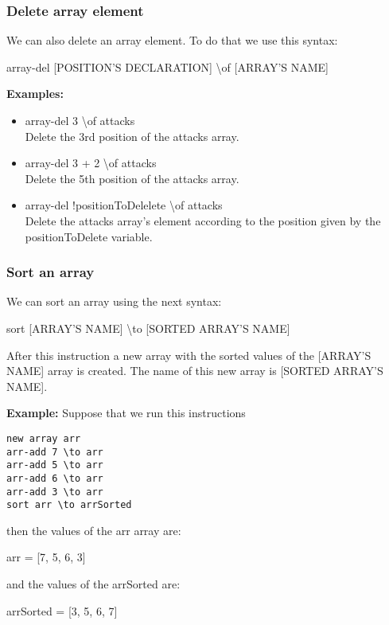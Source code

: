 \documentclass[11pt,a4paper,openright,oneside]{book}
\newenvironment{exs}
{
  \setlength{\parindent}{0cm}
  \large \textbf{Examples:} \normalsize
}
{}
\newenvironment{ex}
{
  \setlength{\parindent}{0cm}
  \large \textbf{Example:} \normalsize 
}
{}
\begin{document}
\subsubsection{Delete array element}
We can also delete an array element. To do that we use this syntax:
\begin{center} \textsf{array-del \textsc{\scriptsize[POSITION'S DECLARATION]} \textbackslash of \textsc{\scriptsize[ARRAY'S NAME]}} \normalsize \end{center}
\begin{exs} 
  \begin{itemize}
    \item \textsf{array-del 3 \textbackslash of attacks} \\
    Delete the 3rd position of the \textsf{attacks} array.
    \item \textsf{array-del 3 + 2 \textbackslash of attacks} \\
    Delete the 5th position of the \textsf{attacks} array.
    \item \textsf{array-del !positionToDelelete \textbackslash of attacks} \\
    Delete the \textsf{attacks} array's element according to the position given by the \textsf{positionToDelete} variable.
  \end{itemize}
\end{exs}

\subsubsection{Sort an array}
We can sort an array using the next syntax:
\begin{center} \textsf{sort \textsc{\scriptsize[ARRAY'S NAME]} \textbackslash to \textsc{\scriptsize[SORTED ARRAY'S NAME]}} \normalsize \end{center}
After this instruction a new array with the sorted values of the \textsc{\scriptsize[ARRAY'S NAME]} array is created. The name of this new array is \textsc{\scriptsize[SORTED ARRAY'S NAME]}.

\begin{ex} Suppose that we run this instructions
  \begin{lstlisting}
new array arr
arr-add 7 \to arr
arr-add 5 \to arr
arr-add 6 \to arr
arr-add 3 \to arr
sort arr \to arrSorted
  \end{lstlisting}
  then the values of the \textsf{arr} array are:
  \begin{center} \textsf{arr = [7, 5, 6, 3]}\end{center}
  and the values of the \textsf{arrSorted} are:
  \begin{center} \textsf{arrSorted = [3, 5, 6, 7]}\end{center}
\end{ex}
\end{document}
